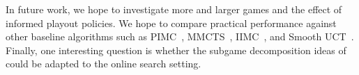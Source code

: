 \documentclass{aamas2015}
\newcounter{vlNoteCounter}
\newcommand{\vlnote}[1]{{\scriptsize \color{blue} $\blacksquare$ \refstepcounter{vlNoteCounter}\textsf{[VL]$_{\arabic{vlNoteCounter}}$:{#1}}}}
\renewcommand{\vlnote}[1]{}
\begin{document}
In future work, we hope to investigate more and larger games and the effect of informed playout policies. 
We hope to compare practical performance against other baseline algorithms such as 
PIMC~\cite{Long10Understanding}, MMCTS~\cite{Auger11Multiple}, IIMC~\cite{Furtak13Recursive}, and Smooth UCT~\cite{Heinrich14}.
Finally, one interesting question is whether the subgame decomposition ideas of~\cite{Burch14Solving,Jackson14} could be 
adapted to the online search setting. 



%

%
%
\end{document}
